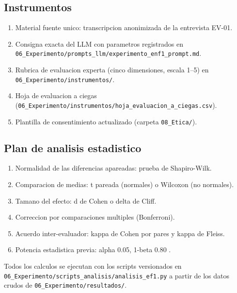 \documentclass[11pt,a4paper]{article}
\begin{document}
\subsection{Instrumentos}
\begin{enumerate}
    \item Material fuente unico: transcripcion anonimizada de la entrevista
    EV-01.
    \item Consigna exacta del LLM con parametros registrados en
    \texttt{06\_Experimento/prompts\_llm/experimento\_enf1\_prompt.md}.
    \item Rubrica de evaluacion experta (cinco dimensiones, escala 1--5) en
    \texttt{06\_Experimento/instrumentos/}.
    \item Hoja de evaluacion a ciegas
    (\texttt{06\_Experimento/instrumentos/hoja\_evaluacion\_a\_ciegas.csv}).
    \item Plantilla de consentimiento actualizado (carpeta \texttt{08\_Etica/}).
\end{enumerate}

\subsection{Plan de analisis estadistico}
\begin{enumerate}
    \item Normalidad de las diferencias apareadas: prueba de Shapiro-Wilk.
    \item Comparacion de medias: t pareada (normales) o Wilcoxon (no normales).
    \item Tamano del efecto: d de Cohen o delta de Cliff.
    \item Correccion por comparaciones multiples (Bonferroni).
    \item Acuerdo inter-evaluador: kappa de Cohen por pares y kappa de Fleiss.
    \item Potencia estadistica previa: alpha 0.05, 1-beta 0.80
    \cite{molleri2020}.
\end{enumerate}
Todos los calculos se ejecutan con los scripts versionados en
\texttt{06\_Experimento/scripts\_analisis/analisis\_ef1.py} a partir de los
datos crudos de \texttt{06\_Experimento/resultados/}.



\end{document}
